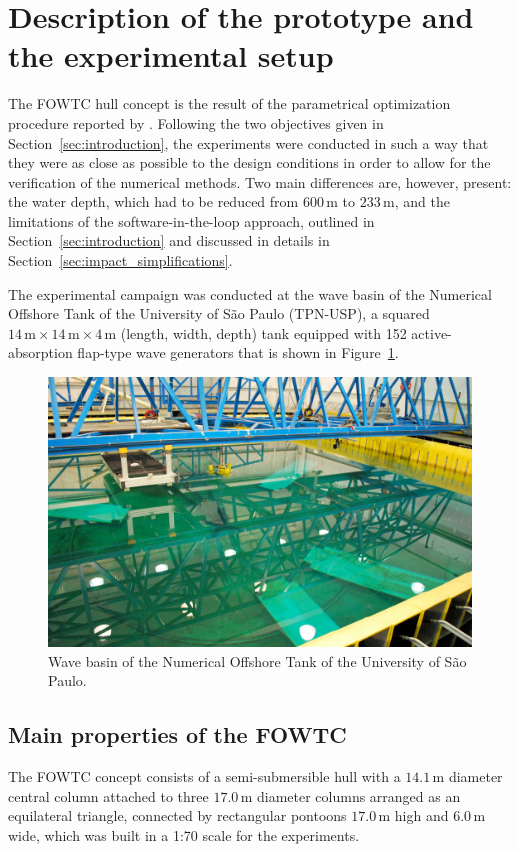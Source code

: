 \section{Description of the prototype and the experimental setup} \label{sec:description_experiment}
The FOWTC hull concept is the result of the parametrical optimization procedure reported by \citet{mas2022parametric}. Following the two objectives given in Section~\ref{sec:introduction}, the experiments were conducted in such a way that they were as close as possible to the design conditions in order to allow for the verification of the numerical methods. Two main differences are, however, present: the water depth, which had to be reduced from $600\,\text{m}$ to $233\,\text{m}$, and the limitations of the software-in-the-loop approach, outlined in Section~\ref{sec:introduction} and discussed in details in Section~\ref{sec:impact_simplifications}.

The experimental campaign was conducted at the wave basin of the Numerical Offshore Tank of the University of São Paulo (TPN-USP), a squared $14\,\text{m}\times 14\,\text{m} \times 4\,\text{m}$ (length, width, depth) tank equipped with 152 active-absorption flap-type wave generators that is shown in Figure~\ref{fig:description_experiment:tanque}.
\begin{figure}[!hbtp]
	\centering
	\includegraphics[width=0.5\columnwidth]{./figures/CH-tpn.jpg}%
	\caption{Wave basin of the Numerical Offshore Tank of the University of São Paulo.} \label{fig:description_experiment:tanque}%
\end{figure}%


\subsection{Main properties of the FOWTC}
The FOWTC concept consists of a semi-submersible hull with a $14.1\,\text{m}$ diameter central column attached to three $17.0\,\text{m}$ diameter columns arranged as an equilateral triangle, connected by rectangular pontoons $17.0\,\text{m}$ high and $6.0\,\text{m}$ wide, which was built in a 1:70 scale for the experiments. 


